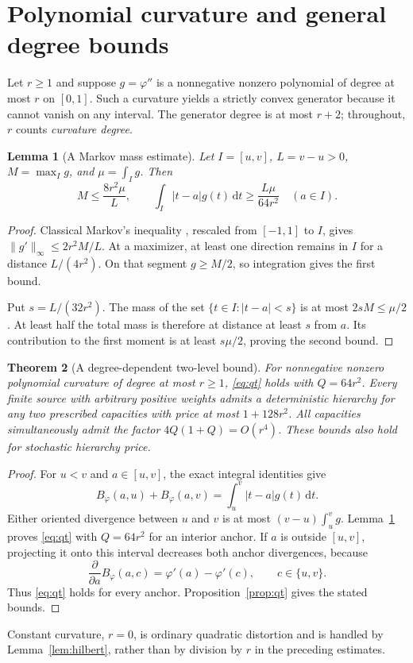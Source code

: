 \documentclass[11pt]{article}
\newtheorem{theorem}{Theorem}[section]
\newtheorem{lemma}[theorem]{Lemma}
\theoremstyle{definition}\newtheorem{definition}[theorem]{Definition}
\theoremstyle{remark}\newtheorem{remark}[theorem]{Remark}
\newcommand{\ph}{\varphi}
\newcommand{\B}{B_{\ph}}
\newcommand{\rd}{\,\mathrm d}
\begin{document}
\section{Polynomial curvature and general degree bounds}
\label{sec:polynomialupper}
Let $r\ge1$ and suppose $g=\ph''$ is a nonnegative nonzero polynomial of degree at most $r$ on $[0,1]$. Such a curvature yields a strictly convex generator because it cannot vanish on any interval. The generator degree is at most $r+2$; throughout, $r$ counts \emph{curvature degree}.

\begin{lemma}[A Markov mass estimate]
\label{lem:markov}
Let $I=[u,v]$, $L=v-u>0$, $M=\max_I g$, and $\mu=\int_I g$. Then
\begin{equation}
M\le\frac{8r^2\mu}{L},\qquad
\int_I|t-a|g(t)\rd t\ge\frac{L\mu}{64r^2}\quad(a\in I).
\label{eq:markovmass}
\end{equation}
\end{lemma}
\begin{proof}
Classical Markov's inequality \cite{shadrin}, rescaled from $[-1,1]$ to $I$, gives $\|g'\|_\infty\le2r^2M/L$. At a maximizer, at least one direction remains in $I$ for a distance $L/(4r^2)$. On that segment $g\ge M/2$, so integration gives the first bound.

Put $s=L/(32r^2)$. The mass of the set $\{t\in I:|t-a|<s\}$ is at most $2sM\le\mu/2$. At least half the total mass is therefore at distance at least $s$ from $a$. Its contribution to the first moment is at least $s\mu/2$, proving the second bound.
\end{proof}

\begin{theorem}[A degree-dependent two-level bound]
\label{thm:polyupper}
For nonnegative nonzero polynomial curvature of degree at most $r\ge1$, \eqref{eq:qt} holds with $Q=64r^2$. Every finite source with arbitrary positive weights admits a deterministic hierarchy for any two prescribed capacities with price at most $1+128r^2$. All capacities simultaneously admit the factor $4Q(1+Q)=O(r^4)$. These bounds also hold for stochastic hierarchy price.
\end{theorem}
\begin{proof}
For $u<v$ and $a\in[u,v]$, the exact integral identities give
\[
\B(a,u)+\B(a,v)=\int_u^v|t-a|g(t)\rd t.
\]
Either oriented divergence between $u$ and $v$ is at most $(v-u)\int_u^v g$. Lemma~\ref{lem:markov} proves \eqref{eq:qt} with $Q=64r^2$ for an interior anchor. If $a$ is outside $[u,v]$, projecting it onto this interval decreases both anchor divergences, because
\[
\frac{\partial}{\partial a}\B(a,c)=\ph'(a)-\ph'(c),\qquad c\in\{u,v\}.
\]
Thus \eqref{eq:qt} holds for every anchor. Proposition~\ref{prop:qt} gives the stated bounds.
\end{proof}
Constant curvature, $r=0$, is ordinary quadratic distortion and is handled by Lemma~\ref{lem:hilbert}, rather than by division by $r$ in the preceding estimates.
\end{document}
